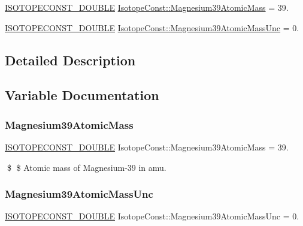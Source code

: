 \begin{DoxyCompactItemize}
\item 
\mbox{\hyperlink{group___isotope_const-_macros_ga8f45a7272ce02c0b4c65c44636ed719a}{I\+S\+O\+T\+O\+P\+E\+C\+O\+N\+S\+T\+\_\+\+D\+O\+U\+B\+LE}} \mbox{\hyperlink{group___isotope_const-_magnesium-_mg39_ga35af89506980070aeb5d78739b58a1f4}{Isotope\+Const\+::\+Magnesium39\+Atomic\+Mass}} = 39.
\item 
\mbox{\hyperlink{group___isotope_const-_macros_ga8f45a7272ce02c0b4c65c44636ed719a}{I\+S\+O\+T\+O\+P\+E\+C\+O\+N\+S\+T\+\_\+\+D\+O\+U\+B\+LE}} \mbox{\hyperlink{group___isotope_const-_magnesium-_mg39_ga16be4fa0a1360fa1b9f1c9ca9f6ab4cb}{Isotope\+Const\+::\+Magnesium39\+Atomic\+Mass\+Unc}} = 0.
\end{DoxyCompactItemize}


\subsection{Detailed Description}


\subsection{Variable Documentation}
\mbox{\label{group___isotope_const-_magnesium-_mg39_ga35af89506980070aeb5d78739b58a1f4}} 
\subsubsection{\texorpdfstring{Magnesium39\+Atomic\+Mass}{Magnesium39AtomicMass}}
{\footnotesize\ttfamily \mbox{\hyperlink{group___isotope_const-_macros_ga8f45a7272ce02c0b4c65c44636ed719a}{I\+S\+O\+T\+O\+P\+E\+C\+O\+N\+S\+T\+\_\+\+D\+O\+U\+B\+LE}} Isotope\+Const\+::\+Magnesium39\+Atomic\+Mass = 39.}

\$ \$ Atomic mass of Magnesium-\/39 in amu. \mbox{\label{group___isotope_const-_magnesium-_mg39_ga16be4fa0a1360fa1b9f1c9ca9f6ab4cb}} 
\subsubsection{\texorpdfstring{Magnesium39\+Atomic\+Mass\+Unc}{Magnesium39AtomicMassUnc}}
{\footnotesize\ttfamily \mbox{\hyperlink{group___isotope_const-_macros_ga8f45a7272ce02c0b4c65c44636ed719a}{I\+S\+O\+T\+O\+P\+E\+C\+O\+N\+S\+T\+\_\+\+D\+O\+U\+B\+LE}} Isotope\+Const\+::\+Magnesium39\+Atomic\+Mass\+Unc = 0.}

